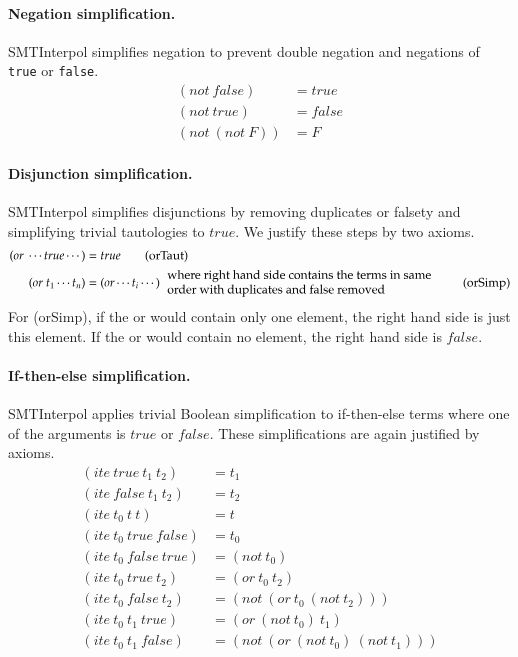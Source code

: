 \documentclass[a4paper]{article}
\newcommand\si{SMTInterpol\xspace}
\begin{document}
\paragraph{Negation simplification.}  \si simplifies negation to prevent
double negation and negations of \verb+true+ or \verb+false+.
\begin{equation}
  \begin{aligned}
    (not\ false) &= true\\
    (not\ true) &= false\\
    (not\ (not\ F)) &= F
  \end{aligned}
\tag{notSimp}
\end{equation}

\paragraph{Disjunction simplification.}  \si simplifies disjunctions by removing
duplicates or falsety and simplifying trivial tautologies to $true$.  We
justify these steps by two axioms.
\begin{align}
  (or\ \cdots true \cdots) &= true \tag{orTaut}\\
  (or\ t_1 \cdots t_n) &= (or \cdots t_i \cdots)
  \text{\begin{tabular}{l}where right hand side contains the terms in same\\
      order with duplicates and false removed\end{tabular}}
  \tag{orSimp}
\end{align}
For (orSimp), if the or would contain only one element, the right hand
side is just this element.  If the or would contain no element, the
right hand side is $false$.

\paragraph{If-then-else simplification.}  \si applies trivial Boolean
simplification to if-then-else terms where one of the arguments is
$true$ or $false$.  These simplifications are again justified by
axioms.
\begin{align}
  (ite\ true\ t_1\ t_2) &= t_1 \tag{iteTrue}\\
  (ite\ false\ t_1\ t_2) &= t_2 \tag{iteFalse}\\
  (ite\ t_0\ t\ t) &= t \tag{iteSame}\\
  (ite\ t_0\ true\ false) &= t_0 \tag{iteBool1}\\
  (ite\ t_0\ false\ true) &= (not\ t_0) \tag{iteBool2}\\
  (ite\ t_0\ true\ t_2) &= (or\ t_0\ t_2) \tag{iteBool3}\\
  (ite\ t_0\ false\ t_2) &= (not\ (or\ t_0\ (not\ t_2))) \tag{iteBool4}\\
  (ite\ t_0\ t_1\ true) &= (or\ (not\ t_0)\ t_1) \tag{iteBool5}\\
  (ite\ t_0\ t_1\ false) &= (not\ (or\ (not\ t_0)\ (not\ t_1))) \tag{iteBool6}
\end{align}
\end{document}
